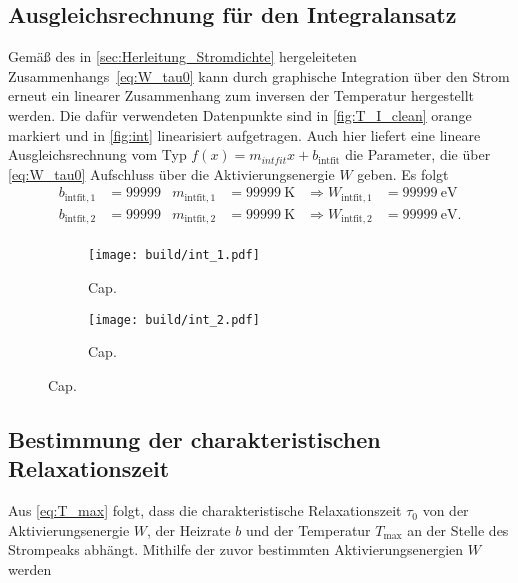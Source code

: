 \subsection{Ausgleichsrechnung für den Integralansatz}
\label{sec:Ausgleichsrechnung_Integralansatz}
Gemäß des in \autoref{sec:Herleitung_Stromdichte} hergeleiteten Zusammenhangs~\eqref{eq:W_tau0} kann durch graphische Integration über den Strom erneut ein linearer 
Zusammenhang zum inversen der Temperatur hergestellt werden. Die dafür verwendeten Datenpunkte sind in \autoref{fig:T_I_clean} orange markiert und in \autoref{fig:int}
linearisiert aufgetragen. Auch hier liefert eine lineare Ausgleichsrechnung vom Typ $f(x) = m_{intfit}x + b_{\text{intfit}}$ die Parameter, die über \autoref{eq:W_tau0} Aufschluss
über die Aktivierungsenergie $W$ geben. Es folgt
\begin{align*}
    b_{\text{intfit}, 1} &= \num{99999} & m_{\text{intfit}, 1} &= \qty{99999}{\kelvin} &\Rightarrow W_{\text{intfit}, 1} &= \qty{99999}{\electronvolt} \\
    b_{\text{intfit}, 2} &= \num{99999} & m_{\text{intfit}, 2} &= \qty{99999}{\kelvin} &\Rightarrow W_{\text{intfit}, 2} &= \qty{99999}{\electronvolt}. \\
\end{align*}

\begin{figure}
    \centering
    \begin{subfigure}{\textwidth}
        \centering
        \texttt{[image: build/int\_1.pdf]}
        \caption{Cap.}
        \label{fig:int_1}
    \end{subfigure}
    \begin{subfigure}{\textwidth}
        \centering
        \texttt{[image: build/int\_2.pdf]}
        \caption{Cap.}
        \label{fig:int_2}
    \end{subfigure}
    \caption{Cap.}
    \label{fig:int}
\end{figure}

\subsection{Bestimmung der charakteristischen Relaxationszeit}
\label{sec:Bestimmung_tau}
Aus \autoref{eq:T_max} folgt, dass die charakteristische Relaxationszeit $\tau_0$ von der Aktivierungsenergie $W$, der Heizrate $b$ und der Temperatur $T_{\text{max}}$ an der 
Stelle des Strompeaks abhängt. Mithilfe der zuvor bestimmten Aktivierungsenergien $W$ werden 


